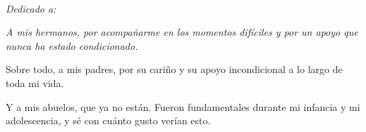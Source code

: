 ~\vfill
\begin{doublespace}
\noindent\fontsize{18}{22}\selectfont\itshape
\nohyphenation
\textcolor{itesomblue}{
Dedicado a:
}
\end{doublespace}

{\itshape
\noindent
A mis hermanos, por acompañarme en los momentos difíciles y por un apoyo que
nunca ha estado condicionado.

\medskip
\noindent
Sobre todo, a mis padres, por su cariño y su apoyo incondicional a lo largo de
toda mi vida.

\medskip
\noindent
Y a mis abuelos, que ya no están. Fueron fundamentales durante mi infancia y mi
adolescencia, y sé con cuánto gusto verían esto.
\par}
\vfill
\vfill